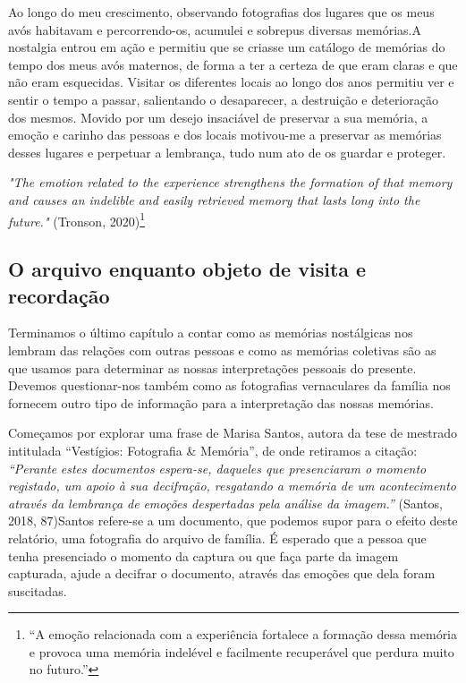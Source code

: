 \documentclass{article}
\begin{document}
Ao longo do meu crescimento, observando fotografias dos lugares que os meus 
avós habitavam e percorrendo-os, acumulei e sobrepus diversas memórias.A nostalgia 
entrou em ação e permitiu que se criasse um catálogo de memórias do tempo dos meus 
avós maternos, de forma a ter a certeza de que eram claras e que não eram esquecidas. 
Visitar  os  diferentes  locais  ao  longo  dos  anos  permitiu  ver  e  sentir  o  tempo  a  passar, 
salientando  o  desaparecer,  a  destruição  e  deterioração  dos  mesmos.  Movido  por  um 
desejo insaciável de preservar a sua memória, a emoção e carinho das pessoas e dos locais 
motivou-me a preservar as memórias desses lugares e perpetuar a lembrança, tudo num 
ato de os guardar e proteger. 
 

\textit{"The emotion related to the experience strengthens the formation of that memory }
\textit{and causes an indelible and easily retrieved memory that lasts long into the future."} 
(Tronson, 2020)\footnote{“A emoção relacionada com a experiência fortalece a formação dessa memória e provoca uma memória indelével e facilmente recuperável que perdura muito no futuro.” } 
 
 
 
 
 
 
 
  
 
 


 



 
\subsection{{{O arquivo enquanto objeto de visita e recordação }}}
 
Terminamos  o  último  capítulo  a  contar  como  as  memórias  nostálgicas  nos 
lembram  das  relações  com  outras  pessoas  e  como  as  memórias  coletivas  são  as  que 
usamos  para  determinar  as  nossas  interpretações  pessoais  do  presente.  Devemos 
questionar-nos também como as fotografias vernaculares da família nos fornecem outro 
tipo de informação para a interpretação das nossas memórias.  
 
Começamos por explorar uma frase de Marisa Santos, autora da tese de mestrado 
intitulada  “Vestígios:  Fotografia  \&  Memória”,  de  onde  retiramos  a  citação:  \textit{“Perante }
\textit{estes documentos espera-se, daqueles que presenciaram o momento registado, um apoio }
\textit{à sua decifração, resgatando a memória de um acontecimento através da lembrança de }
\textit{emoções despertadas pela análise da imagem.”} (Santos, 2018, 87)Santos refere-se a um 
documento, que podemos supor para o efeito deste relatório, uma fotografia do arquivo 
de família. É esperado que a pessoa que tenha presenciado o momento da captura ou que 
faça parte da imagem capturada, ajude a decifrar o documento, através das emoções que 
dela foram suscitadas.  
 
\end{document}
